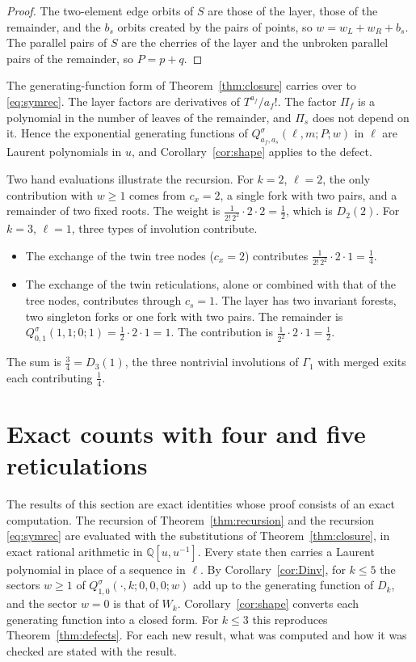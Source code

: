 \documentclass[11pt,a4paper]{article}
\theoremstyle{definition}
\begin{document}
\begin{proof}
The two-element edge orbits of $S$ are those of the layer, those of the remainder, and the $b_s$ orbits created by the pairs of points, so $w=w_L+w_R+b_s$. The parallel pairs of $S$ are the cherries of the layer and the unbroken parallel pairs of the remainder, so $P=p+q$.
\end{proof}

The generating-function form of Theorem~\ref{thm:closure} carries over to \eqref{eq:symrec}. The layer factors are derivatives of $T^{a_f}/a_f!$. The factor $\Pi_f$ is a polynomial in the number of leaves of the remainder, and $\Pi_s$ does not depend on it. Hence the exponential generating functions of $Q^\sigma_{a_f,a_s}(\ell,m;P;w)$ in $\ell$ are Laurent polynomials in $u$, and Corollary~\ref{cor:shape} applies to the defect.

Two hand evaluations illustrate the recursion. For $k=2$, $\ell=2$, the only contribution with $w\ge1$ comes from $c_x=2$, a single fork with two pairs, and a remainder of two fixed roots. The weight is $\frac1{2!\,2^2}\cdot2\cdot2=\frac12$, which is $D_2(2)$. For $k=3$, $\ell=1$, three types of involution contribute.
\begin{itemize}
\item The exchange of the twin tree nodes ($c_x=2$) contributes $\frac1{2!\,2^2}\cdot2\cdot1=\frac14$.
\item The exchange of the twin reticulations, alone or combined with that of the tree nodes, contributes through $c_s=1$. The layer has two invariant forests, two singleton forks or one fork with two pairs. The remainder is $Q^\sigma_{0,1}(1,1;0;1)=\frac12\cdot2\cdot1=1$. The contribution is $\frac1{2^2}\cdot2\cdot1=\frac12$.
\end{itemize}
The sum is $\frac34=D_3(1)$, the three nontrivial involutions of $\Gamma_1$ with merged exits each contributing $\frac14$.


\section{Exact counts with four and five reticulations}\label{sec:k45}

The results of this section are exact identities whose proof consists of an exact computation. The recursion of Theorem~\ref{thm:recursion} and the recursion \eqref{eq:symrec} are evaluated with the substitutions of Theorem~\ref{thm:closure}, in exact rational arithmetic in $\mathbb{Q}[u,u^{-1}]$. Every state then carries a Laurent polynomial in place of a sequence in $\ell$. By Corollary~\ref{cor:Dinv}, for $k\le5$ the sectors $w\ge1$ of $Q^\sigma_{1,0}(\cdot,k;0,0,0;w)$ add up to the generating function of $D_k$, and the sector $w=0$ is that of $W_k$. Corollary~\ref{cor:shape} converts each generating function into a closed form. For $k\le3$ this reproduces Theorem~\ref{thm:defects}. For each new result, what was computed and how it was checked are stated with the result.
\end{document}
